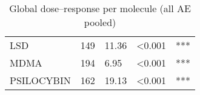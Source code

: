 \begin{table}[!h]
\centering
\caption{Global dose–response per molecule (all AE pooled)}
\centering
\begin{tabular}[t]{lrlll}
\toprule
LSD & 149 & 11.36 & <0.001 & ***\\
MDMA & 194 & 6.95 & <0.001 & ***\\
PSILOCYBIN & 162 & 19.13 & <0.001 & ***\\
\bottomrule
\end{tabular}
\end{table}
